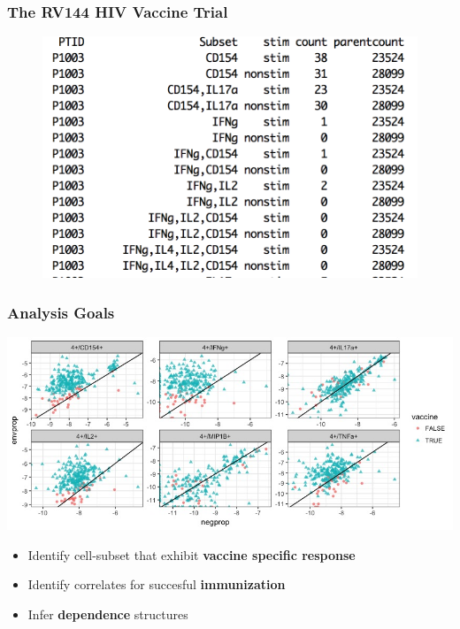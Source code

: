 \documentclass{beamer}
\theoremstyle{definition}
\begin{document}
\begin{frame}
\frametitle{The RV144 HIV Vaccine Trial}
\begin{figure}[]
\includegraphics[width=12 cm]{figures/datasetExample} \caption{}
\end{figure}
\end{frame}


\begin{frame}
\frametitle{Analysis Goals} 
\begin{center}
\includegraphics[scale=0.35]{figures/marginalScatterNoPost}
\end{center}
\begin{itemize}
\item Identify cell-subset that exhibit \textbf{vaccine specific response}
\item Identify correlates for succesful \textbf{immunization}
\item Infer \textbf{dependence} structures
\end{itemize}
\end{frame}

\end{document}
